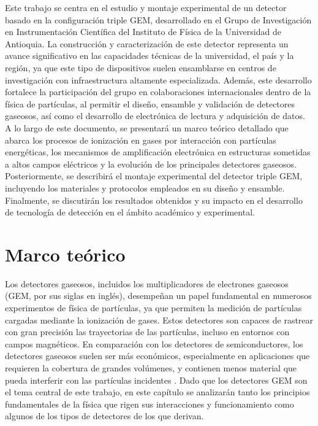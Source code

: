 \documentclass{report}
\begin{document}
\noindent Este trabajo se centra en el estudio y montaje experimental de un detector basado en la configuración triple GEM, desarrollado en el Grupo de Investigación en Instrumentación Científica del Instituto de Física de la Universidad de Antioquia. La construcción y caracterización de este detector representa un avance significativo en las capacidades técnicas de la universidad, el país y la región, ya que este tipo de dispositivos suelen ensamblarse en centros de investigación con infraestructura altamente especializada. Además, este desarrollo fortalece la participación del grupo en colaboraciones internacionales dentro de la física de partículas, al permitir el diseño, ensamble y validación de detectores gaseosos, así como el desarrollo de electrónica de lectura y adquisición de datos.\\

\noindent A lo largo de este documento, se presentará un marco teórico detallado que abarca los procesos de ionización en gases por interacción con partículas energéticas, los mecanismos de amplificación electrónica en estructuras sometidas a altos campos eléctricos y la evolución de los principales detectores gaseosos. Posteriormente, se describirá el montaje experimental del detector triple GEM, incluyendo los materiales y protocolos empleados en su diseño y ensamble. Finalmente, se discutirán los resultados obtenidos y su impacto en el desarrollo de tecnología de detección en el ámbito académico y experimental.\\

\newpage
\section{Marco teórico}

\noindent Los detectores gaseosos, incluidos los multiplicadores de electrones gaseosos (GEM, por sus siglas en inglés), desempeñan un papel fundamental en numerosos experimentos de física de partículas, ya que permiten la medición de partículas cargadas mediante la ionización de gases. Estos detectores son capaces de rastrear con gran precisión las trayectorias de las partículas, incluso en entornos con campos magnéticos. En comparación con los detectores de semiconductores, los detectores gaseosos suelen ser más económicos, especialmente en aplicaciones que requieren la cobertura de grandes volúmenes, y contienen menos material que pueda interferir con las partículas incidentes \cite{sauli2015gaseous}. Dado que los detectores GEM son el tema central de este trabajo, en este capítulo se analizarán tanto los principios fundamentales de la física que rigen sus interacciones y funcionamiento como algunos de los tipos de detectores de los que derivan.\\ 
\end{document}
